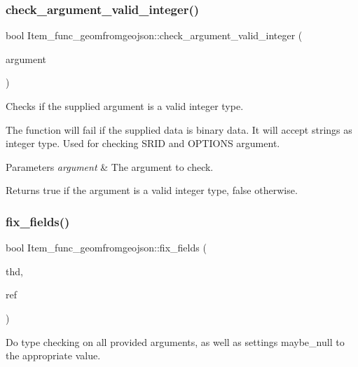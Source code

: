 \subsubsection{\texorpdfstring{check\+\_\+argument\+\_\+valid\+\_\+integer()}{check\_argument\_valid\_integer()}}
{\footnotesize\ttfamily bool Item\+\_\+func\+\_\+geomfromgeojson\+::check\+\_\+argument\+\_\+valid\+\_\+integer (\begin{DoxyParamCaption}\item[{\mbox{\hyperlink{classItem}{Item}} $\ast$}]{argument }\end{DoxyParamCaption})\hspace{0.3cm}{\ttfamily [static]}}

Checks if the supplied argument is a valid integer type.

The function will fail if the supplied data is binary data. It will accept strings as integer type. Used for checking S\+R\+ID and O\+P\+T\+I\+O\+NS argument.


\begin{DoxyParams}{Parameters}
{\em argument} & The argument to check.\\
\hline
\end{DoxyParams}
\begin{DoxyReturn}{Returns}
true if the argument is a valid integer type, false otherwise. 
\end{DoxyReturn}
\mbox{\label{classItem__func__geomfromgeojson_ab149d10aad09cc883fda14a95e340059}} 
\subsubsection{\texorpdfstring{fix\+\_\+fields()}{fix\_fields()}}
{\footnotesize\ttfamily bool Item\+\_\+func\+\_\+geomfromgeojson\+::fix\+\_\+fields (\begin{DoxyParamCaption}\item[{T\+HD $\ast$}]{thd,  }\item[{\mbox{\hyperlink{classItem}{Item}} $\ast$$\ast$}]{ref }\end{DoxyParamCaption})\hspace{0.3cm}{\ttfamily [virtual]}}

Do type checking on all provided arguments, as well as settings maybe\+\_\+null to the appropriate value. 

